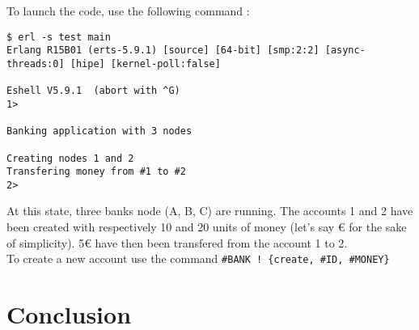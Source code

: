 \documentclass[11pt,english,a4paper]{article}
\begin{document}
To launch the code, use the following command :
\begin{verbatim}
$ erl -s test main
Erlang R15B01 (erts-5.9.1) [source] [64-bit] [smp:2:2] [async-threads:0] [hipe] [kernel-poll:false]

Eshell V5.9.1  (abort with ^G)
1> 

Banking application with 3 nodes

Creating nodes 1 and 2
Transfering money from #1 to #2
2>
\end{verbatim}
At this state, three banks node (A, B, C) are running.
The accounts 1 and 2 have been created with respectively 10 and 20 units of money (let's say € for the sake of simplicity).
5€ have then been transfered from the account 1 to 2.\\

To create a new account use the command \texttt{#BANK ! \{create, #ID, #MONEY\}}

\section{Conclusion}
 
\end{document}
